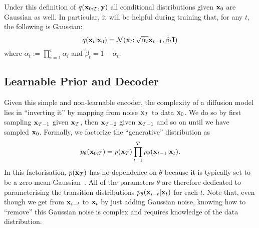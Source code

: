 Under this definition of $q({\mathbf{x}}_{0:T}, {\mathbf{y}})$ all conditional distributions given ${\mathbf{x}}_0$ are Gaussian as well. In particular, it will be helpful during training that, for any $t$, the following is Gaussian: 
\begin{equation} \label{eq:q-step-iddpm}
    q({\mathbf{x}}_t | {\mathbf{x}}_0) = {\mathcal{N}}({\mathbf{x}}_t ; \sqrt{\bar{\alpha}_t}  {\mathbf{x}}_{t-1} , \bar{\beta}_t {\mathbf{I}} )
\end{equation}
where $\bar{\alpha}_t := \prod_{i=1}^t \alpha_i$ and $\bar{\beta}_t = 1 - \bar{\alpha}_t$.

\subsection{Learnable Prior and Decoder}
Given this simple and non-learnable encoder, the complexity of a diffusion model lies in ``inverting it'' by mapping from noise ${\mathbf{x}}_T$ to data ${\mathbf{x}}_0$. We do so by first sampling ${\mathbf{x}}_{T-1}$ given ${\mathbf{x}}_T$, then ${\mathbf{x}}_{T-2}$ given ${\mathbf{x}}_{T-1}$ and so on until we have sampled ${\mathbf{x}}_0$. Formally, we factorize the ``generative'' distribution as
\begin{equation}
    p_\theta({\mathbf{x}}_{0:T}) = p({\mathbf{x}}_T) \prod_{t=1}^T p_\theta({\mathbf{x}}_{t-1}|{\mathbf{x}}_t).
\end{equation}
In this factorisation, $p({\mathbf{x}}_T)$ has no dependence on $\theta$ because it is typically set to be a zero-mean Gaussian~\citep{ho2020denoising}. All of the parameters $\theta$ are therefore dedicated to parameterising the transition distributions $p_\theta({\mathbf{x}}_{i-t}|{\mathbf{x}}_t)$ for each $t$. Note that, even though we get from ${\mathbf{x}}_{i-t}$ to ${\mathbf{x}}_t$ by just adding Gaussian noise, knowing how to ``remove'' this Gaussian noise is complex and requires knowledge of the data distribution.


